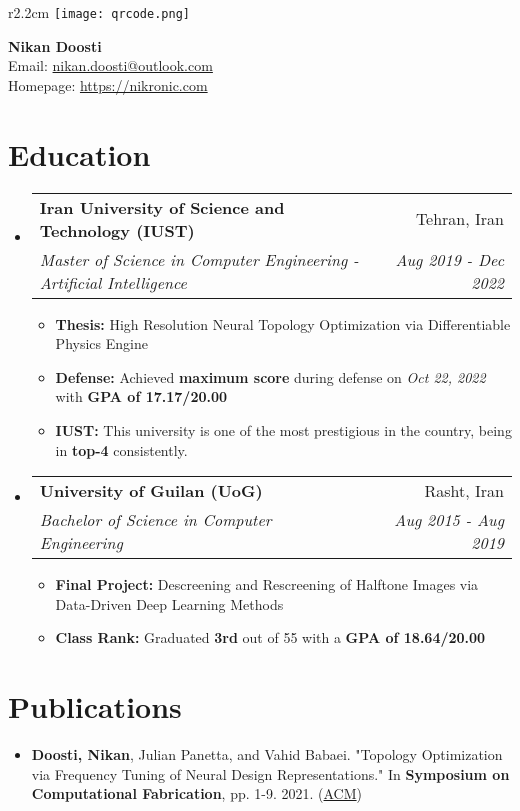 \documentclass[letterpaper,11pt]{article}
\makeatletter
\newcommand{\resumeItem}[1]{
  \item\small{
    {#1 \vspace{0pt}}
  }
}
\newcommand{\resumeSubheadingF}[4]{
  \item
    \begin{tabular*}{0.97\textwidth}{l@{\extracolsep{\fill}}r}
      \textbf{#1} & #2 \\ 
      \textit{\small#3} & \textit{\small #4} \\
    \end{tabular*}\vspace{-5pt}
}
\newcommand{\resumeSubHeadingListStart}{\begin{itemize}[leftmargin=*]}
\newcommand{\resumeSubHeadingListEnd}{\end{itemize}}
\newcommand{\resumeItemListStart}{\begin{itemize}}
\newcommand{\resumeItemListEnd}{\end{itemize}\vspace{-5pt}}
\makeatother
\begin{document}
\begin{wrapfigure}{r}{2.2cm} %
  \vspace{-\baselineskip} %
  \texttt{[image: qrcode.png]}
\end{wrapfigure}

\textbf{{\Large Nikan Doosti}} \\
Email: \href{mailto:nikan.doosti@outlook.com}{nikan.doosti@outlook.com}\\
Homepage: \href{https://nikronic.com/}{https://nikronic.com}

\hspace{0cm} %
\section{Education}
 \resumeSubHeadingListStart
   \resumeSubheadingF
     {Iran University of Science and Technology (IUST)}{Tehran, Iran}
     {Master of Science in Computer Engineering - Artificial Intelligence}{Aug 2019 - Dec 2022}
      \resumeItemListStart
        \resumeItem{\textbf{Thesis:} High Resolution Neural Topology Optimization via Differentiable Physics Engine}
        \resumeItem{\textbf{Defense:} Achieved \textbf{maximum score} during defense on \textit{Oct 22, 2022} with \textbf{GPA of 17.17/20.00}}
        \resumeItem{\textbf{IUST:} This university is one of the most prestigious in the country, being in \textbf{top-4} consistently.}
      \resumeItemListEnd
   \resumeSubheadingF
     {University of Guilan (UoG)}{Rasht, Iran}
     {Bachelor of Science in Computer Engineering}{Aug 2015 - Aug 2019}
     \resumeItemListStart
        \resumeItem{\textbf{Final Project:} Descreening and Rescreening of Halftone Images via Data-Driven Deep Learning Methods}
        \resumeItem{\textbf{Class Rank:} Graduated \textbf{3rd} out of 55 with a \textbf{GPA of 18.64/20.00}}
      \resumeItemListEnd
 \resumeSubHeadingListEnd

\section{Publications}
\label{sec:publication}
 \resumeSubHeadingListStart
   \resumeItem{\textbf{Doosti, Nikan}, Julian Panetta, and Vahid Babaei. "Topology Optimization via Frequency Tuning of Neural Design Representations." In \textbf{Symposium on Computational Fabrication}, pp. 1-9. 2021. (\href{https://dl.acm.org/doi/abs/10.1145/3485114.3485124}{ACM})}
\resumeSubHeadingListEnd
\end{document}
